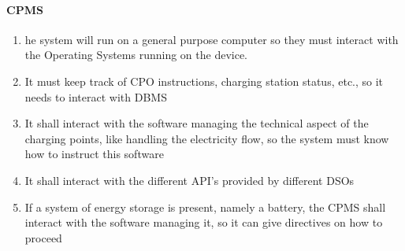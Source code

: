 \paragraph{CPMS}
\begin{enumerate}
    \item he system will run on a general purpose computer so they must interact with the Operating Systems running on the device.
    \item It must keep track of CPO instructions, charging station status, etc., so it needs to interact with DBMS
    \item It shall interact with the software managing the technical aspect of the charging points, like handling the electricity flow, so the system must know how to instruct this software
    \item It shall interact with the different API's provided by different DSOs
    \item If a system of energy storage is present, namely a battery, the CPMS shall interact with the software managing it, so it can give directives on how to proceed
\end{enumerate}